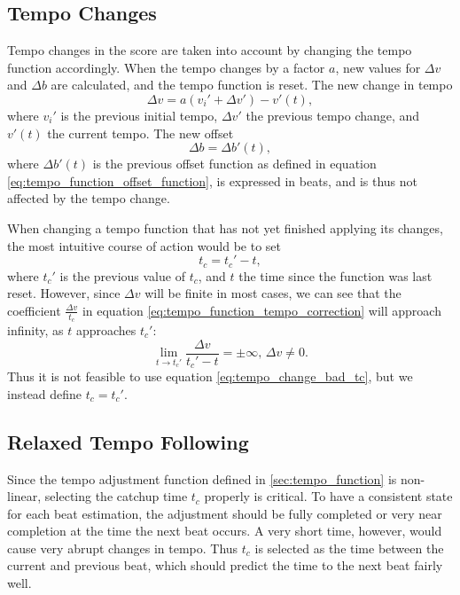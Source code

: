 \subsection{Tempo Changes}


Tempo changes in the score are taken into account
by changing the tempo function accordingly.
When the tempo changes by a factor $a$,
new values for $\Delta v$ and $\Delta b$ are calculated,
and the tempo function is reset.
The new change in tempo
\begin{equation}
\Delta v = a \left( v_i' + \Delta v' \right) - v'(t),
\end{equation}
where $v_i'$ is the previous initial tempo,
$\Delta v'$ the previous tempo change,
and $v'(t)$ the current tempo.
The new offset
\begin{equation}
\Delta b = \Delta b'(t),
\end{equation}
where $\Delta b'(t)$ is the previous offset function
as defined in equation \ref{eq:tempo_function_offset_function},
is expressed in beats,
and is thus not affected by the tempo change.

When changing a tempo function that has not yet
finished applying its changes,
the most intuitive course of action would be to set
\begin{equation}
\label{eq:tempo_change_bad_tc}
t_c = t_c' - t,
\end{equation}
where $t_c'$ is the previous value of $t_c$,
and $t$ the time since the function was last reset.
However, since $\Delta v$ will be finite in most cases,
we can see that the coefficient $\frac{\Delta v}{t_c}$
in equation \ref{eq:tempo_function_tempo_correction}
will approach infinity,
as $t$ approaches $t_c'$:
\begin{equation}
\lim_{t \to t_c'} \frac{\Delta v}{t_c' - t} = \pm \infty,
\, \Delta v \neq 0.
\end{equation}
Thus it is not feasible to use equation \ref{eq:tempo_change_bad_tc},
but we instead define $t_c = t_c'$.

\subsection{Relaxed Tempo Following}

Since the tempo adjustment function defined in
\ref{sec:tempo_function} is non-linear,
selecting the catchup time $t_c$ properly is critical.
To have a consistent state for each beat estimation,
the adjustment should be fully completed
or very near completion
at the time the next beat occurs.
A very short time, however,
would cause very abrupt changes in tempo.
Thus $t_c$ is selected as the time between
the current and previous beat,
which should predict the time to the next
beat fairly well.


